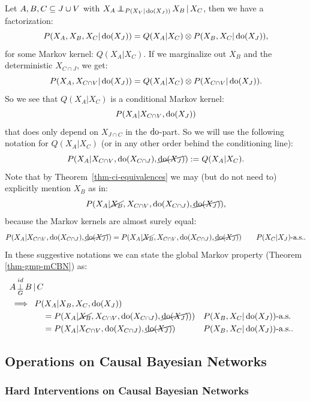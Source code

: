 \begin{Not}
    Let $A,B,C \subseteq J \cup V$ with $X_A \operatorname*{\perp\mkern-11mu\perp}_{P(X_V|\operatorname{do}(X_J))} X_B \operatorname*{|} X_C$, then we have a factorization:
    \[ P(X_A,X_B,X_C|\operatorname{do}(X_J)) = Q(X_A|X_C) \otimes P(X_B,X_C|\operatorname{do}(X_J)),\]
    for some Markov kernel: $Q(X_A|X_C)$. If we marginalize out $X_B$ and the deterministic $X_{C \cap J}$,
    we get:
    \[ P(X_A,X_{C\cap V}|\operatorname{do}(X_J)) = Q(X_A|X_C) \otimes P(X_{C\cap V}|\operatorname{do}(X_J)).\]
    So we see that $Q(X_A|X_C)$ is a conditional Markov kernel:
    \[P(X_A|X_{C\cap V},\operatorname{do}(X_J)) \]
    that does only depend on $X_{J \cap C}$ in the $\operatorname{do}$-part.
    So we will use the following notation for $Q(X_A|X_C)$ (or in any other order behind the conditioning line):
    \[ P(X_A|X_{C \cap V},\operatorname{do}(X_{C \cap J}),\cancel{\operatorname{do}(X_J)}) := Q(X_A|X_C).  \]
    Note that by Theorem~\ref{thm-ci-equivalences} we may (but do not need to) explicitly mention $X_B$ as in:
    \[ P(X_A|\cancel{X_B},X_{C \cap V},\operatorname{do}(X_{C \cap J}),\cancel{\operatorname{do}(X_J)}),  \]
    because the Markov kernels are almost surely equal:
  \[ P(X_A|X_{C \cap V},\operatorname{do}(X_{C \cap J}),\cancel{\operatorname{do}(X_J)}) = P(X_A|\cancel{X_B},X_{C \cap V},\operatorname{do}(X_{C \cap J}),\cancel{\operatorname{do}(X_J)}) \qquad P(X_C|X_J)\text{-a.s.}.\]
    In these suggestive notations we can state the global Markov property (Theorem \ref{thm-gmp-mCBN}) as:
    \begin{align*} 
    &A \operatorname*{\perp}^{id}_G B \operatorname*{|} C \\
    &\implies \; P(X_A|X_B,X_C,\operatorname{do}(X_J)) \\
      & \qquad\qquad = P(X_A|\cancel{X_B},X_{C \cap V},\operatorname{do}(X_{C \cap J}),\cancel{\operatorname{do}(X_J)})) && P(X_B,X_C|\operatorname{do}(X_J))\text{-a.s.} \\
      & \qquad\qquad = P(X_A|X_{C \cap V},\operatorname{do}(X_{C \cap J}),\cancel{\operatorname{do}(X_J)}) && P(X_B,X_C|\operatorname{do}(X_J))\text{-a.s.}. 
    \end{align*}
\end{Not}




\subsection{Operations on Causal Bayesian Networks}
\subsubsection{Hard Interventions on Causal Bayesian Networks}

